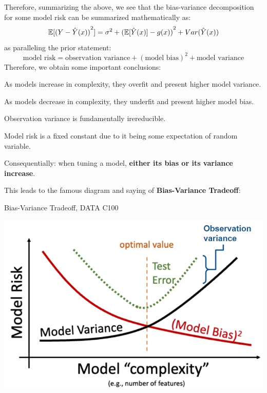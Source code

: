 Therefore, summarizing the above, we see that the bias-variance decomposition for some model risk can be summarized mathematically as:
\[
    \mathbb{E}[{(Y - \hat{Y}(x))}^2] = \sigma^2 + {(\mathbb{E}[\hat{Y}(x)] - g(x))}^2 + Var(\hat{Y}(x))
\]
as paralleling the prior statement:
\[
    \text{model risk} = \text{observation variance} + {(\text{model bias})}^2 + \text{model variance}
\]
Therefore, we obtain some important conclusions:
\begin{bindenum}
    \item As models increase in complexity, they overfit and present higher model variance.
    \item As models decrease in complexity, they underfit and present higher model bias.
    \item Observation variance is fundamentally irereducible.
    \item Model risk is a fixed constant due to it being some expectation of random variable.
\end{bindenum}
Consequentially: when tuning a model, \textbf{either its bias or its variance increase}.

This leads to the famous diagram and saying of \textbf{Bias-Variance Tradeoff}:
\begin{ln-fig}{Bias-Variance Tradeoff, DATA C100}{}
    \begin{center}
        \includegraphics[scale=0.8]{figs/ln09/bv-tradeoff.png}
    \end{center}
\end{ln-fig}
